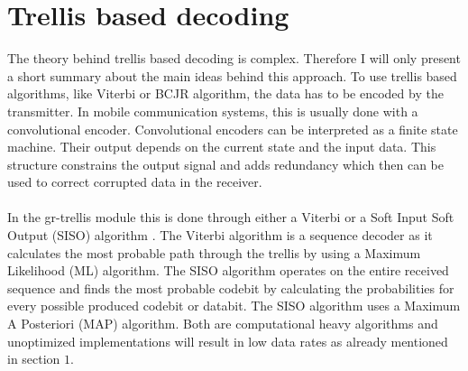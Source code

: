 \documentclass[11pt,		%
	    DIV12,		%
	    a4paper,		%
	    final,		%
	    halfparskip,	%
	    ]{scrartcl}		%
\begin{document}
\section{Trellis based decoding}
The theory behind trellis based decoding is complex. Therefore I will only present a short summary about the main ideas behind this approach. To use trellis based algorithms, like Viterbi or BCJR algorithm, the data has to be encoded by the transmitter. In mobile communication systems, this is usually done with a convolutional encoder. Convolutional encoders can be interpreted as a finite state machine. Their output depends on the current state and the input data. This structure constrains the output signal and adds redundancy which then can be used to correct corrupted data in the receiver. \\ \\In the gr-trellis module this is done through either a Viterbi or a Soft Input Soft Output (SISO) algorithm \cite{gnrDoc}. The Viterbi algorithm is a sequence decoder as it calculates the most probable path through the trellis by using a Maximum Likelihood (ML) algorithm. The SISO algorithm operates on the entire received sequence and finds the most probable codebit by calculating the probabilities for every possible produced codebit or databit. The SISO algorithm uses a Maximum A Posteriori (MAP) algorithm. Both are computational heavy algorithms and unoptimized implementations will result in low data rates as already mentioned in section $1$. 
\end{document}
